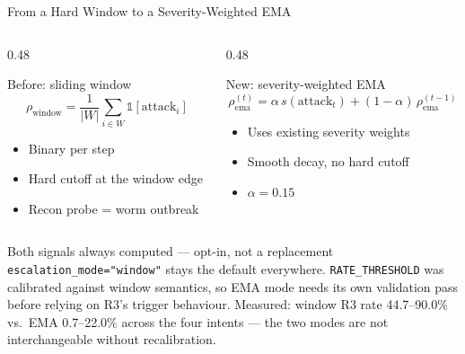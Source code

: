 \documentclass[aspectratio=169, 12pt]{beamer}
\begin{document}
\begin{frame}{From a Hard Window to a Severity-Weighted EMA}
  \begin{columns}[T]
    \begin{column}{0.48\textwidth}
      \begin{block}{Before: sliding window}
        \[
          \rho_{\text{window}} = \frac{1}{|W|}\sum_{i \in W} \mathbb{1}[\text{attack}_i]
        \]
        \begin{itemize}
          \item Binary per step
          \item Hard cutoff at the window edge
          \item Recon probe = worm outbreak
        \end{itemize}
      \end{block}
    \end{column}
    \begin{column}{0.48\textwidth}
      \begin{exampleblock}{New: severity-weighted EMA}
        \[
          \rho^{(t)}_{\text{ema}} = \alpha\, s(\text{attack}_t) + (1-\alpha)\,\rho^{(t-1)}_{\text{ema}}
        \]
        \begin{itemize}
          \item Uses existing severity weights
          \item Smooth decay, no hard cutoff
          \item $\alpha = 0.15$
        \end{itemize}
      \end{exampleblock}
    \end{column}
  \end{columns}
  \vspace{0.3cm}
  \begin{alertblock}{Both signals always computed --- opt-in, not a replacement}
    \texttt{escalation\_mode="window"} stays the default everywhere.
    \texttt{RATE\_THRESHOLD} was calibrated against window semantics, so
    EMA mode needs its own validation pass before relying on R3's
    trigger behaviour. Measured: window R3 rate 44.7--90.0\% vs.\ EMA
    0.7--22.0\% across the four intents --- the two modes are not
    interchangeable without recalibration.
  \end{alertblock}
\end{frame}
\end{document}
